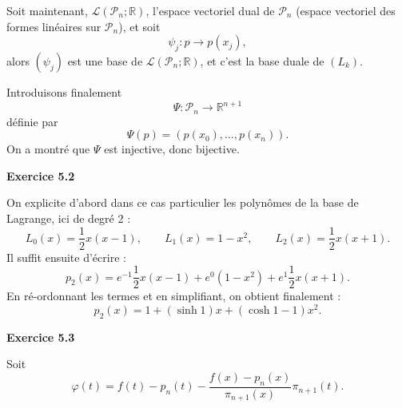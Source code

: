 \documentclass{article}
\begin{document}
\medskip

Soit maintenant, $\mathcal{L}(\mathcal{P}_n;\mathbb{R})$, l'espace vectoriel dual de $\mathcal{P}_n$ (espace vectoriel des formes linéaires sur $\mathcal{P}_n$), et soit
$$
\psi_j : p \rightarrow p(x_j),
$$
alors $(\psi_j)$ est une base de $\mathcal{L}(\mathcal{P}_n;\mathbb{R})$, et c'est la base duale de $(L_k)$.

\medskip

Introduisons finalement
\[
\Psi : \mathcal{P}_n \rightarrow \mathbb{R}^{n+1}
\]
définie par
\[
\Psi(p) = ( p(x_0), \ldots , p(x_n) ).
\]
On a montré que $\Psi$ est injective, donc bijective.

\bigskip

{\bf Exercice 5.2}

On explicite d'abord dans ce cas particulier les polynômes de la base de Lagrange, ici de degré 2 :
\[
L_0(x) = \frac12 x ( x - 1 ), \qquad
L_1(x) = 1 - x^2, \qquad
L_2(x) = \frac12 x ( x + 1 ).
\]
Il suffit ensuite d'écrire :
\[
p_2 (x) = e^{-1} \frac12 x(x-1) + e^0(1-x^2) + e^1 \frac12 x(x+1).
\]
En ré-ordonnant les termes et en simplifiant, on obtient finalement :
\[
p_2 (x) = 1 + (\sinh{1}) x + (\cosh{1} - 1) x^2.
\]

{\bf Exercice 5.3}

Soit 
\[
\varphi(t) = f(t) - p_n(t) - \frac{f(x)-p_n(x)}{\pi_{n+1}(x)} \pi_{n+1} (t).
\]
\end{document}
